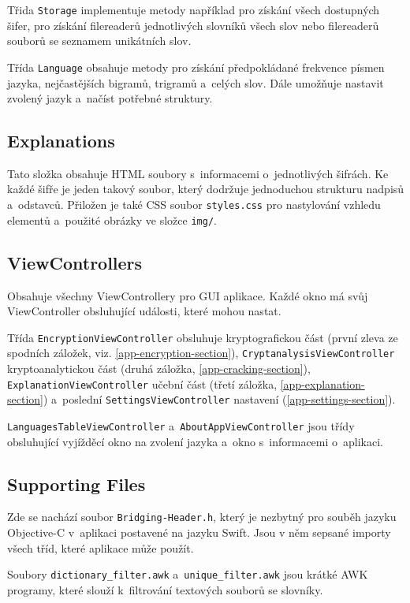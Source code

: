 \documentclass[glossaries, index]{kidiplom}
\begin{document}
Třida \texttt{Storage} implementuje metody například pro získání všech dostupných šifer, pro získání filereaderů jednotlivých slovníků všech slov nebo filereaderů souborů se seznamem unikátních slov.

Třída \texttt{Language} obsahuje metody pro získání předpokládané frekvence písmen jazyka, nejčastějších bigramů, trigramů a~celých slov. Dále umožňuje nastavit zvolený jazyk a~načíst potřebné struktury.


\subsection{Explanations}
Tato složka obsahuje HTML soubory s~informacemi o~jednotlivých šifrách. Ke každé šifře je jeden takový soubor, který dodržuje jednoduchou strukturu nadpisů a~odstavců. Přiložen je také CSS soubor \texttt{styles.css} pro nastylování vzhledu elementů a~použité obrázky ve složce \texttt{img/}.

\subsection{ViewControllers}
Obsahuje všechny ViewControllery pro GUI aplikace. Každé okno má svůj ViewController obsluhující události, které mohou nastat. 

Třída \texttt{EncryptionViewController} obsluhuje kryptografickou část (první zleva ze spodních záložek, viz. \ref{app-encryption-section}), \texttt{CryptanalysisViewController} kryptoanalytickou část (druhá záložka, \ref{app-cracking-section}), \texttt{ExplanationViewController} učební část (třetí záložka, \ref{app-explanation-section}) a~poslední \texttt{SettingsViewController} nastavení (\ref{app-settings-section}).

\texttt{LanguagesTableViewController} a~\texttt{AboutAppViewController} jsou třídy obsluhující vyjížděcí okno na zvolení jazyka a~okno s~informacemi o~aplikaci.


\subsection{Supporting Files}
Zde se nachází soubor \texttt{Bridging-Header.h}, který je nezbytný pro souběh jazyku Objective-C v~aplikaci postavené na jazyku Swift. Jsou v něm sepsané importy všech tříd, které aplikace může použít.

Soubory \texttt{dictionary\_filter.awk} a~\texttt{unique\_filter.awk} jsou krátké AWK programy, které slouží k~filtrování textových souborů se slovníky.
\end{document}
